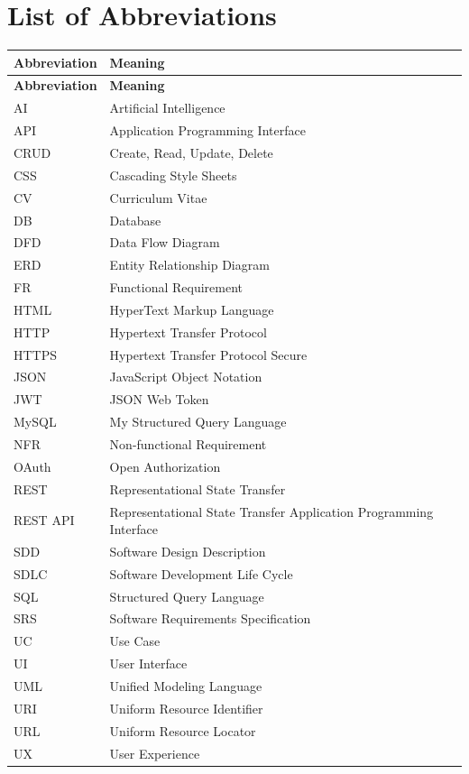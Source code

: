 \chapter*{List of Abbreviations}

\renewcommand{\arraystretch}{1.4}

\begin{longtable}{|>{\centering\arraybackslash}p{3.5cm}|p{11cm}|}
\hline
\textbf{Abbreviation} & \textbf{Meaning} \\ \hline
\endfirsthead

\hline
\textbf{Abbreviation} & \textbf{Meaning} \\ \hline
\endhead

AI & Artificial Intelligence \\ \hline
API & Application Programming Interface \\ \hline
CRUD & Create, Read, Update, Delete \\ \hline
CSS & Cascading Style Sheets \\ \hline
CV & Curriculum Vitae \\ \hline
DB & Database \\ \hline
DFD & Data Flow Diagram \\ \hline
ERD & Entity Relationship Diagram \\ \hline
FR & Functional Requirement \\ \hline
HTML & HyperText Markup Language \\ \hline
HTTP & Hypertext Transfer Protocol \\ \hline
HTTPS & Hypertext Transfer Protocol Secure \\ \hline
JSON & JavaScript Object Notation \\ \hline
JWT & JSON Web Token \\ \hline
MySQL & My Structured Query Language \\ \hline
NFR & Non-functional Requirement \\ \hline
OAuth & Open Authorization \\ \hline
REST & Representational State Transfer \\ \hline
REST API & Representational State Transfer Application Programming Interface \\ \hline
SDD & Software Design Description \\ \hline
SDLC & Software Development Life Cycle \\ \hline
SQL & Structured Query Language \\ \hline
SRS & Software Requirements Specification \\ \hline
UC & Use Case \\ \hline
UI & User Interface \\ \hline
UML & Unified Modeling Language \\ \hline
URI & Uniform Resource Identifier \\ \hline
URL & Uniform Resource Locator \\ \hline
UX & User Experience \\ \hline

\end{longtable}